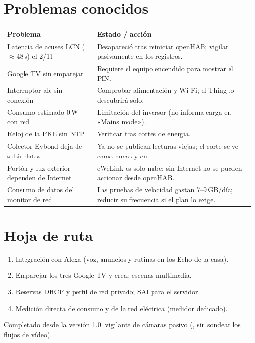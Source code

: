 \documentclass[11pt,a4paper]{report}
\newcommand{\code}[1]{\texttt{\detokenize{#1}}}
\begin{document}
\section{Problemas conocidos}
\begin{longtable}{@{}p{5cm}p{9.8cm}@{}}
\toprule
\textbf{Problema} & \textbf{Estado / acción}\\\midrule\endhead
Latencia de acuses LCN ($\approx$48\,s) el 2/11 & Desapareció tras reiniciar openHAB; vigilar pasivamente en los registros.\\
Google TV sin emparejar & Requiere el equipo encendido para mostrar el PIN.\\
Interruptor ale sin conexión & Comprobar alimentación y Wi-Fi; el Thing lo descubrirá solo.\\
Consumo estimado 0\,W con red & Limitación del inversor (no informa carga en «Mains mode»).\\
Reloj de la PKE sin NTP & Verificar tras cortes de energía.\\
Colector Eybond deja de subir datos & Ya no se publican lecturas viejas; el corte se ve como hueco y en \code{Energia_ApiEstado}.\\
Portón y luz exterior dependen de Internet & eWeLink es solo nube: sin Internet no se pueden accionar desde openHAB.\\
Consumo de datos del monitor de red & Las pruebas de velocidad gastan 7--9\,GB/día; reducir su frecuencia si el plan lo exige.\\
\bottomrule
\end{longtable}

\section{Hoja de ruta}
\begin{enumerate}[nosep]
  \item Integración con Alexa (voz, anuncios y rutinas en los Echo de la casa).
  \item Emparejar los tres Google TV y crear escenas multimedia.
  \item Reservas DHCP y perfil de red privado; SAI para el servidor.
  \item Medición directa de consumo y de la red eléctrica (medidor dedicado).
\end{enumerate}
Completado desde la versión 1.0: vigilante de cámaras pasivo (\code{camaras-vigilancia.js}, sin sondear
los flujos de vídeo).
\end{document}
